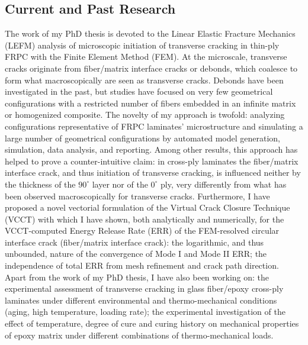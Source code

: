 \documentclass[
  a4paper, 
]{fortysecondscv}
\begin{document}
\subsection{Current and Past Research}
The work of my PhD thesis is devoted to the Linear Elastic Fracture Mechanics (LEFM) analysis of microscopic initiation of transverse cracking in thin-ply FRPC with the Finite Element Method (FEM). At the microscale, transverse cracks originate from fiber/matrix interface cracks or debonds, which coalesce to form what macroscopically are seen as transverse cracks. Debonds have been investigated in the past, but studies have focused on very few geometrical configurations with a restricted number of fibers embedded in an infinite matrix or homogenized composite. The novelty of my approach is twofold: analyzing configurations representative of FRPC laminates' microstructure and simulating a large number of geometrical configurations by automated model generation, simulation, data analysis, and reporting. Among other results, this approach has helped to prove a counter-intuitive claim: in cross-ply laminates the fiber/matrix interface crack, and thus initiation of transverse cracking, is influenced neither by the thickness of the $90^{\circ}$ layer nor of the $0^{\circ}$ ply, very differently from what has been observed macroscopically for transverse cracks. Furthermore, I have proposed a novel vectorial formulation of the Virtual Crack Closure Technique (VCCT) with which I have shown, both analytically and numerically, for the VCCT-computed Energy Release Rate (ERR) of the FEM-resolved circular interface crack (fiber/matrix interface crack): the logarithmic, and thus unbounded, nature of the convergence of Mode I and Mode II ERR; the independence of total ERR from mesh refinement and crack path direction.\\
Apart from the work of my PhD thesis, I have also been working on: the experimental assessment of transverse cracking in glass fiber/epoxy cross-ply laminates under different environmental and thermo-mechanical conditions (aging, high temperature, loading rate); the experimental investigation of the effect of temperature, degree of cure and curing history on mechanical properties of epoxy matrix under different combinations of thermo-mechanical loads.
\end{document}
